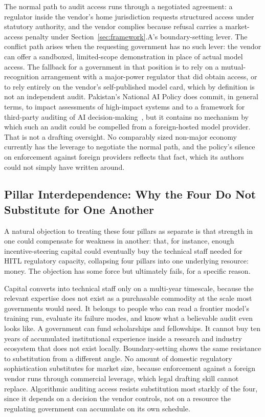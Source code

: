 \documentclass{ieeeaccess}
\begin{document}
The normal path to audit access runs through a negotiated agreement: a regulator inside the vendor's home jurisdiction requests structured access under statutory authority, and the vendor complies because refusal carries a market-access penalty under Section~\ref{sec:framework}.A's boundary-setting lever. The conflict path arises when the requesting government has no such lever: the vendor can offer a sandboxed, limited-scope demonstration in place of actual model access.
The fallback for a government in that position is to rely on a mutual-recognition arrangement with a major-power regulator that did obtain access, or to rely entirely on the vendor's self-published model card, which by definition is not an independent audit. Pakistan's National AI Policy does commit, in general terms, to impact assessments of high-impact systems and to a framework for third-party auditing of AI decision-making~\cite{pakistan2025nationalaipolicy}, but it contains no mechanism by which such an audit could be compelled from a foreign-hosted model provider.
That is not a drafting oversight. No comparably sized non-major economy currently has the leverage to negotiate the normal path, and the policy's silence on enforcement against foreign providers reflects that fact, which its authors could not simply have written around.

\subsection{Pillar Interdependence: Why the Four Do Not Substitute for One Another}

A natural objection to treating these four pillars as separate is that strength in one could compensate for weakness in another: that, for instance, enough incentive-steering capital could eventually buy the technical staff needed for HITL regulatory capacity, collapsing four pillars into one underlying resource: money. The objection has some force but ultimately fails, for a specific reason.

Capital converts into technical staff only on a multi-year timescale, because the relevant expertise does not exist as a purchasable commodity at the scale most governments would need. It belongs to people who can read a frontier model's training run, evaluate its failure modes, and know what a believable audit even looks like. A government can fund scholarships and fellowships. It cannot buy ten years of accumulated institutional experience inside a research and industry ecosystem that does not exist locally. Boundary-setting shows the same resistance to substitution from a different angle. No amount of domestic regulatory sophistication substitutes for market size, because enforcement against a foreign vendor runs through commercial leverage, which legal drafting skill cannot replace. Algorithmic auditing access resists substitution most starkly of the four, since it depends on a decision the vendor controls, not on a resource the regulating government can accumulate on its own schedule.
\end{document}

